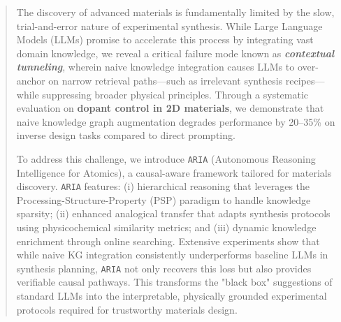 \begin{abstract}
The discovery of advanced materials is fundamentally limited by the slow, trial-and-error nature of experimental synthesis. While Large Language Models (LLMs) promise to accelerate this process by integrating vast domain knowledge, we reveal a critical failure mode known as \textbf{\textit{contextual tunneling}}, wherein naive knowledge integration causes LLMs to over-anchor on narrow retrieval paths---such as irrelevant synthesis recipes---while suppressing broader physical principles. Through a systematic evaluation on \textbf{dopant control in 2D materials}, we demonstrate that naive knowledge graph augmentation degrades performance by 20--35\% on inverse design tasks compared to direct prompting.

To address this challenge, we introduce \texttt{ARIA} (Autonomous Reasoning Intelligence for Atomics), a causal-aware framework tailored for materials discovery. \texttt{ARIA} features: (i) hierarchical reasoning that leverages the Processing-Structure-Property (PSP) paradigm to handle knowledge sparsity; (ii) enhanced analogical transfer that adapts synthesis protocols using physicochemical similarity metrics; and (iii) dynamic knowledge enrichment through online searching. Extensive experiments show that while naive KG integration consistently underperforms baseline LLMs in synthesis planning, \texttt{ARIA} not only recovers this loss but also provides verifiable causal pathways. This transforms the "black box" suggestions of standard LLMs into the interpretable, physically grounded experimental protocols required for trustworthy materials design.
\end{abstract}